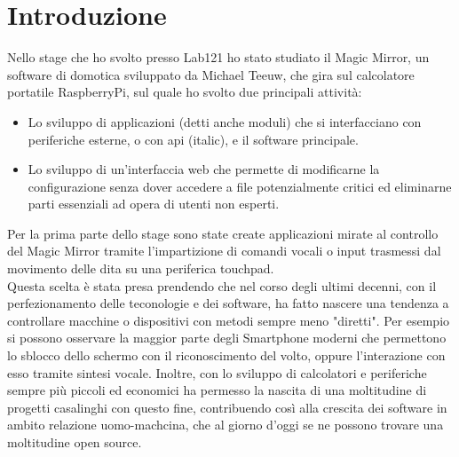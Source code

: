\chapter*{Introduzione}

Nello stage che ho svolto presso Lab121 ho stato studiato il Magic Mirror, un software di domotica sviluppato da Michael Teeuw,
che gira sul calcolatore portatile RaspberryPi\cite{Raspberry}, sul quale ho svolto due principali attività:\\
\begin{itemize}
\item Lo sviluppo di applicazioni (detti anche moduli) che si interfacciano con periferiche esterne, o con api (italic), e il software
principale.
\item Lo sviluppo di un'interfaccia web che permette di modificarne la configurazione senza dover accedere
a file potenzialmente critici ed eliminarne parti essenziali ad opera di utenti non esperti.\\[1\baselineskip]
\end{itemize}
Per la prima parte dello stage sono state create applicazioni mirate al controllo del
Magic Mirror tramite l'impartizione di comandi vocali o input trasmessi dal movimento delle dita su
una periferica touchpad.\\
Questa scelta \`e stata presa prendendo che nel corso
degli ultimi decenni, con il perfezionamento delle teconologie e dei software, ha fatto nascere
una tendenza a controllare macchine o dispositivi con metodi sempre meno "diretti".
Per esempio si possono osservare la maggior parte degli Smartphone moderni che permettono lo sblocco dello schermo con
il riconoscimento del volto, oppure l'interazione con esso tramite sintesi vocale.
Inoltre, con lo sviluppo di calcolatori e periferiche sempre più piccoli ed economici ha permesso
la nascita di una moltitudine di progetti casalinghi con questo fine, contribuendo così
alla crescita dei software in ambito relazione uomo-machcina, che al giorno d'oggi se ne possono trovare
una moltitudine open source.
\\[2\baselineskip]
